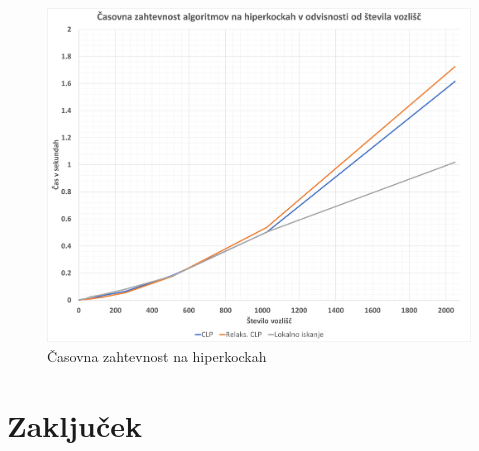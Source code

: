 \documentclass[a4paper, 12 pt]{article}
\theoremstyle{definition}
\theoremstyle{plain}
\theoremstyle{remark}
\begin{document}
\begin{figure}[H]
\centering
  \includegraphics[scale=0.30]{Casovna_zahtevnost_hiperkocke.png}
  \caption{Časovna zahtevnost na hiperkockah}
\end{figure}

\section{Zaključek}


\end{document}
